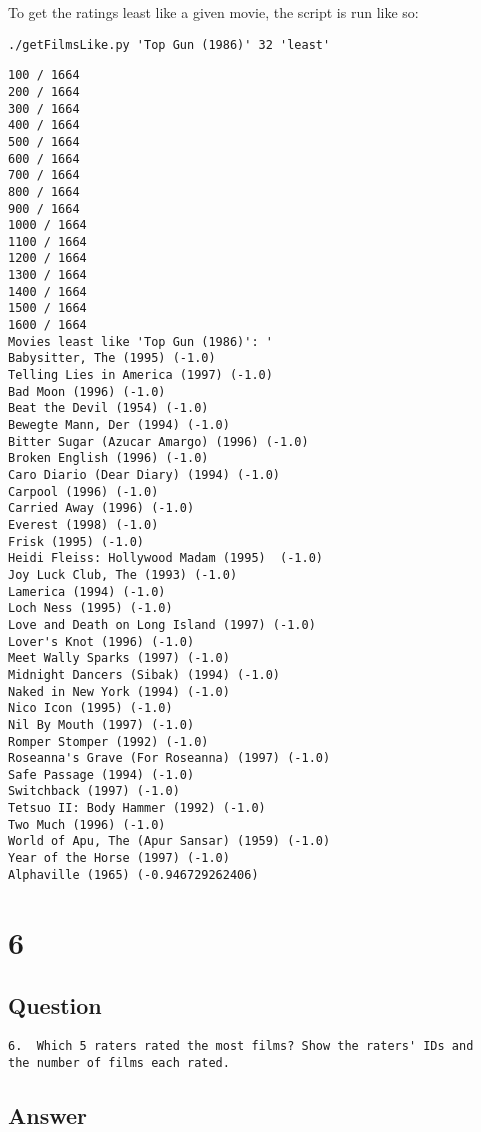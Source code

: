 \documentclass[letterpaper,11pt]{article}
\begin{document}
To get the ratings least like a given movie, the script is run like so:
\begin{lstlisting}[frame=single]
./getFilmsLike.py 'Top Gun (1986)' 32 'least'
\end{lstlisting}

\begin{lstlisting}[frame=single]
100 / 1664
200 / 1664
300 / 1664
400 / 1664
500 / 1664
600 / 1664
700 / 1664
800 / 1664
900 / 1664
1000 / 1664
1100 / 1664
1200 / 1664
1300 / 1664
1400 / 1664
1500 / 1664
1600 / 1664
Movies least like 'Top Gun (1986)': '
Babysitter, The (1995) (-1.0)
Telling Lies in America (1997) (-1.0)
Bad Moon (1996) (-1.0)
Beat the Devil (1954) (-1.0)
Bewegte Mann, Der (1994) (-1.0)
Bitter Sugar (Azucar Amargo) (1996) (-1.0)
Broken English (1996) (-1.0)
Caro Diario (Dear Diary) (1994) (-1.0)
Carpool (1996) (-1.0)
Carried Away (1996) (-1.0)
Everest (1998) (-1.0)
Frisk (1995) (-1.0)
Heidi Fleiss: Hollywood Madam (1995)  (-1.0)
Joy Luck Club, The (1993) (-1.0)
Lamerica (1994) (-1.0)
Loch Ness (1995) (-1.0)
Love and Death on Long Island (1997) (-1.0)
Lover's Knot (1996) (-1.0)
Meet Wally Sparks (1997) (-1.0)
Midnight Dancers (Sibak) (1994) (-1.0)
Naked in New York (1994) (-1.0)
Nico Icon (1995) (-1.0)
Nil By Mouth (1997) (-1.0)
Romper Stomper (1992) (-1.0)
Roseanna's Grave (For Roseanna) (1997) (-1.0)
Safe Passage (1994) (-1.0)
Switchback (1997) (-1.0)
Tetsuo II: Body Hammer (1992) (-1.0)
Two Much (1996) (-1.0)
World of Apu, The (Apur Sansar) (1959) (-1.0)
Year of the Horse (1997) (-1.0)
Alphaville (1965) (-0.946729262406)
\end{lstlisting}

\newpage

\section*{6}

\subsection*{Question}

\begin{verbatim}
6.  Which 5 raters rated the most films? Show the raters' IDs and
the number of films each rated.
\end{verbatim}

\newpage
\subsection*{Answer}
\end{document}
